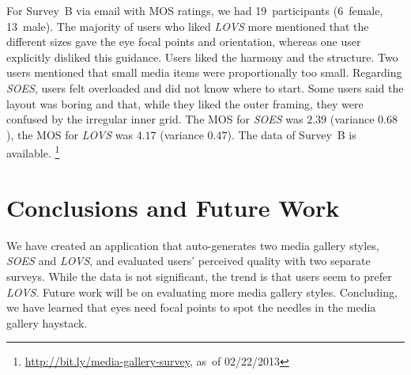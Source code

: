 \documentclass{sig-alt-release2}
\newcommand{\inlinelistingsize}{\fontsize{8pt}{11pt}}
\let\oldurl\url
\renewcommand{\url}[1]{\inlinelistingsize\oldurl{#1}}
\begin{document}
For Survey~B via email with MOS ratings,
we had 19~participants (6~female, 13~male).
The majority of users who liked \emph{LOVS} more
mentioned that the different sizes
gave the eye focal points and orientation,
whereas one user explicitly disliked this guidance.
Users liked the harmony and the structure.
Two users mentioned that small media items were proportionally too small.
Regarding \emph{SOES}, users felt overloaded and did not know where to start.
Some users said the layout was boring and that,
while they liked the outer framing,
they were confused by the irregular inner grid.
The MOS for \emph{SOES} was $2.39$ (variance $0.68$),
the MOS for \emph{LOVS} was $4.17$ (variance $0.47$).
The data of Survey~B is available.%
\footnote{\url{http://bit.ly/media-gallery-survey},
as~of 02/22/2013}

\section{Conclusions and Future Work}

We have created an application that auto-generates 
two media gallery styles, \emph{SOES} and \emph{LOVS},
and evaluated users' perceived quality with two separate surveys. 
While the data is not significant, the trend is that users
seem to prefer \emph{LOVS}.
Future work will be on evaluating more media gallery styles.
Concluding, we have learned that eyes need focal points
to spot the needles in the media gallery haystack.

\begin{spacing}{0.9}


\end{spacing}
\end{document}
